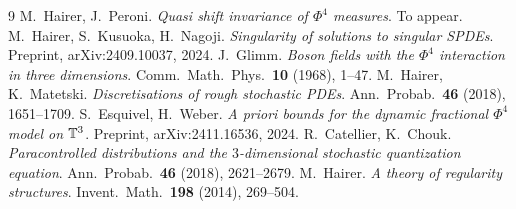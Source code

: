 \begin{thebibliography}{9}
 M.~Hairer, J.~Peroni.
  \emph{Quasi shift invariance of $\Phi^4$ measures}. To appear.
 M.~Hairer, S.~Kusuoka, H.~Nagoji.
  \emph{Singularity of solutions to singular SPDEs}.
  Preprint, arXiv:2409.10037, 2024.
 J.~Glimm.
  \emph{Boson fields with the $\Phi^4$ interaction in three dimensions}.
  Comm.\ Math.\ Phys.\ \textbf{10} (1968), 1--47.
 M.~Hairer, K.~Matetski.
  \emph{Discretisations of rough stochastic PDEs}.
  Ann.\ Probab.\ \textbf{46} (2018), 1651--1709.
 S.~Esquivel, H.~Weber.
  \emph{A priori bounds for the dynamic fractional $\Phi^4$ model on $\mathbb{T}^3$}.
  Preprint, arXiv:2411.16536, 2024.
 R.~Catellier, K.~Chouk.
  \emph{Paracontrolled distributions and the $3$-dimensional stochastic
  quantization equation}. Ann.\ Probab.\ \textbf{46} (2018), 2621--2679.
 M.~Hairer.
  \emph{A theory of regularity structures}. Invent.\ Math.\ \textbf{198} (2014),
  269--504.
\end{thebibliography}

\endgroup
